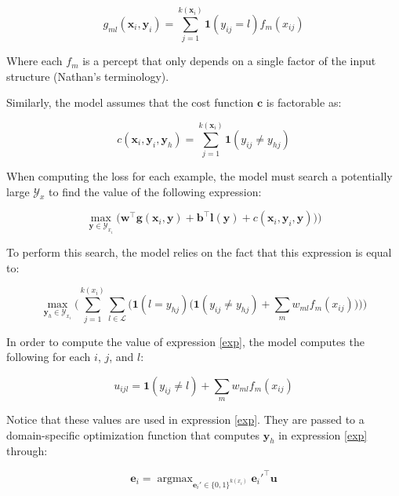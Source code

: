 \documentclass[11pt,letterpaper]{article}
\DeclareMathOperator*{\argmax}{argmax}
\begin{document}
\begin{equation}
g_{ml}(\mathbf{x}_i,\mathbf{y}_i)=\sum_{j=1}^{k(\mathbf{x}_i)}\mathbf{1}(y_{ij}=l)f_m(x_{ij})
\end{equation}

Where each $f_m$ is a percept that only depends on a single factor of the 
input structure (Nathan's terminology).

Similarly, the model assumes that the cost function $\mathbf{c}$ is factorable as:

\begin{equation}
c(\mathbf{x}_i,\mathbf{y}_i,\mathbf{y}_h)=\sum_{j=1}^{k(\mathbf{x}_i)}\mathbf{1}(y_{ij}\neq y_{hj})
\end{equation}

When computing the loss for each example, the model must search a potentially large $\mathcal{Y}_x$ to find the value of the following expression:

\begin{equation}
\max_{\mathbf{y}\in \mathcal{Y}_{x_i}}\Big(\mathbf{w}^\top\mathbf{g}(\mathbf{x}_i,\mathbf{y})+\mathbf{b}^\top \mathbf{l}(\mathbf{y})+c(\mathbf{x}_i,\mathbf{y}_i,\mathbf{y})\Big)\bigg)
\end{equation}

To perform this search, the model relies on the fact that this expression is equal to:

\begin{equation}
\label{exp}
\max_{\mathbf{y}_h\in \mathcal{Y}_{x_i}}\Bigg(\sum_{j=1}^{k(x_i)}\sum_{l\in\mathcal{L}}\bigg( \mathbf{1}(l=y_{hj})\Big( \mathbf{1}(y_{ij}\neq y_{hj})+\sum_m w_{ml}f_m(x_{ij})\Big) \bigg)\Bigg)
\end{equation}

In order to compute the value of expression \ref{exp}, the model computes the following
for each $i$, $j$, and $l$:

\begin{equation}
u_{ijl} = \mathbf{1}(y_{ij}\neq l)+\sum_m w_{ml}f_m(x_{ij})
\end{equation}

Notice that these values are used in expression \ref{exp}.  They are passed to a domain-specific optimization function that computes $\mathbf{y}_h$ in expression \ref{exp} through:

\begin{equation}
\label{ilp}
\mathbf{e}_i=\argmax_{\mathbf{e}_i'\in\{0,1\}^{k(x_i)}}\mathbf{e}_i'^\top \mathbf{u}
\end{equation}
\end{document}
